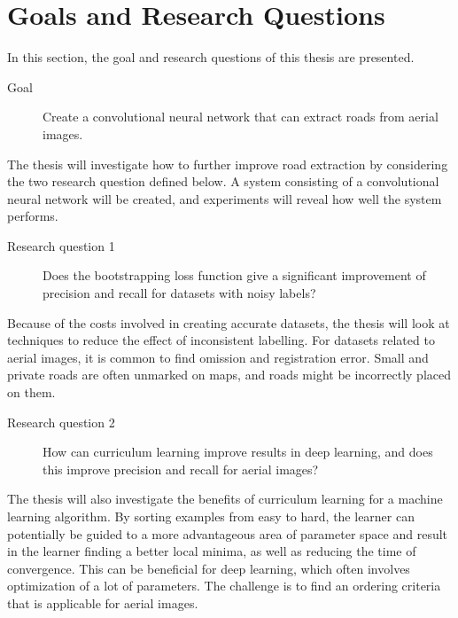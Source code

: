 \section{Goals and Research Questions}
\label{sec:Goals and Research Questions}
In this section, the goal and research questions of this thesis are presented. 

\begin{description}
\item[Goal] Create a convolutional neural network that can extract roads from aerial images.
\end{description}

The thesis will investigate how to further improve road extraction by considering the two research question defined below. A system consisting of a convolutional neural network will be created, and experiments will reveal how well the system performs.

\begin{description}
\item[Research question 1] Does the bootstrapping loss function give a significant improvement of precision and recall for datasets with noisy labels?
\end{description}

Because of the costs involved in creating accurate datasets, the thesis will look at techniques to reduce the effect of inconsistent labelling. For datasets related to aerial images, it is common to find omission and registration error. Small and private roads are often unmarked on maps, and roads might be incorrectly placed on them.


\begin{description}
\item[Research question 2]  How can curriculum learning improve results in deep learning, and does this improve precision and recall for aerial images?
\end{description}

The thesis will also investigate the benefits of curriculum learning for a machine learning algorithm. By sorting examples from easy to hard, the learner can potentially be guided to a more advantageous area of parameter space and result in the learner finding a better local minima, as well as reducing the time of convergence. This can be beneficial for deep learning, which often involves optimization of a lot of parameters. The challenge is to find an ordering criteria that is applicable for aerial images. 
